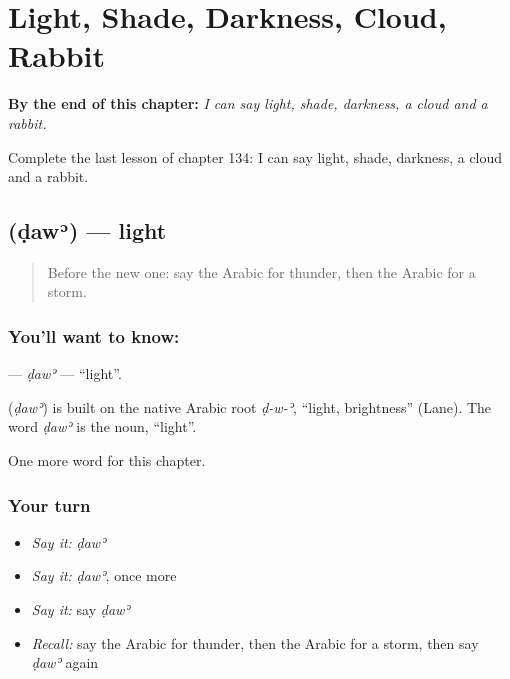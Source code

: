 
\chapter{Light, Shade, Darkness, Cloud, Rabbit}
\label{ch:ar-light-shade-darkness-cloud-rabbit}

\begin{chapteropening}
\textbf{By the end of this chapter:} \emph{I can say light, shade, darkness, a cloud and a rabbit.}

Complete the last lesson of chapter 134: I can say light, shade, darkness, a cloud and a rabbit.
\end{chapteropening}

\section[\texorpdfstring{\ar{ضوء} (ḍawʾ)}{ضوء (ḍawʾ)}]{ (ḍawʾ) — light}

\label{lesson:AR-C134-daw}



\begin{quote}
Before the new one: say the Arabic for thunder, then the Arabic for a storm.
\end{quote}

\subsection*{You'll want to know: }
\textbf{} — \emph{ḍawʾ} — \textquotedblleft{}light\textquotedblright{}.

\begin{cousinweb}
\textbf{} (\emph{ḍawʾ}) is built on the native Arabic root \emph{ḍ-w-ʾ}, \textquotedblleft{}light, brightness\textquotedblright{} (Lane). The word \emph{ḍawʾ} is the noun, \textquotedblleft{}light\textquotedblright{}.
\end{cousinweb}

\begin{grammarlens}[title={What you've built}]
One more word for this chapter.
\end{grammarlens}

\subsection*{Your turn}
\begin{itemize}
\raggedright
  \item \emph{Say it:} \emph{ḍawʾ}
  \item \emph{Say it:} \emph{ḍawʾ}, once more
  \item \emph{Say it:} say \emph{ḍawʾ}
  \item \emph{Recall:} say the Arabic for thunder, then the Arabic for a storm, then say \emph{ḍawʾ} again
\end{itemize}

